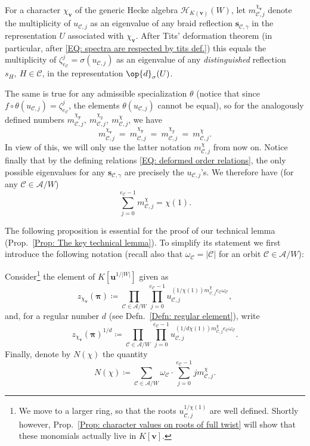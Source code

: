 For a character $\chi_{\bm v}$ of the generic Hecke algebra $\mathcal{H}_{K(\bm v)}(W)$, let $m^{\chi_{\bm v}}_{\mathcal{C},j}$ denote the multiplicity of $u_{\mathcal{C},j}$ as an eigenvalue of any braid reflection $\bm s_{\mathcal{C},\gamma}$ in the representation $U$ associated with $\chi_{\bm v}$. After Tits' deformation theorem (in particular, after \eqref{EQ: spectra are respected by tits def.}) this equals the multiplicity of $\zeta_{e_{\mathcal{C}}}^j=\sigma (u_{\mathcal{C},j})$ as an eigenvalue of any {\it distinguished} reflection $s_H,\ H\in\mathcal{C}$, in the representation $\op{d}_{\sigma}(U)$. 

The same is true for any admissible specialization $\theta$ (notice that since $f\circ\theta (u_{\mathcal{C},j})=\zeta_{e_{\mathcal{C}}}^j$, the elements $\theta(u_{\mathcal{C},j})$ cannot be equal), so for the analogously defined numbers $m^{\chi_{\bm y}}_{\mathcal{C},j},\ m^{\chi_y}_{\mathcal{C},j},\ m^{\chi}_{\mathcal{C},j}$, we have $$  m^{\chi_{\bm v}}_{\mathcal{C},j}\ =\ m^{\chi_{\bm y}}_{\mathcal{C},j}\ =\ m^{\chi_y}_{\mathcal{C},j}\ =\ m^{\chi}_{\mathcal{C},j}.$$ In view of this, we will only use the latter notation $m^{\chi}_{\mathcal{C},j}$ from now on. Notice finally that by the defining relations \eqref{EQ: deformed order relations}, the only possible eigenvalues for any $\bm s_{\mathcal{C},\gamma}$ are precisely the $u_{\mathcal{C},j}$'s. We therefore have (for any $\mathcal{C}\in\mathcal{A}/W$) \begin{equation} \sum_{j=0}^{e_{\mathcal{C}}-1}m^{\chi}_{\mathcal{C},j}=\chi(1).\label{Eq: sum of m_H,j's=chi(1)}\end{equation} 


The following proposition is essential for the proof of our technical lemma (Prop.~\ref{Prop: The key technical lemma}). To simplify its statement we first introduce the following notation (recall also that $\omega_{\mathcal{C}}=|\mathcal{C}|$ for an orbit $\mathcal{C}\in\mathcal{A}/W$):

\begin{defi}\label{Def. Pre character value stuff}
Consider\footnote{We move to a larger ring, so that the roots $u_{\mathcal{C},j}^{1/\chi(1)}$ are well defined. Shortly however, Prop.~\ref{Prop: character values on roots of full twist} will show that these monomials actually live in $K[\bm v]$.} the element of $K[\bm u^{1/|W|}]$ given as $$z_{\chi_{\bm v}}(\bm \pi)\coloneqq \prod_{\mathcal{C}\in\mathcal{A}/W}\prod_{j=0}^{e_{\mathcal{C}}-1}u_{\mathcal{C},j}^{(1/\chi(1))m^{\chi}_{\mathcal{C},j}e_{\mathcal{C}}\omega_{\mathcal{C}}},$$ and, for a regular number $d$ \textup{(}see Defn.~\ref{Defn: regular element}\textup{)}, write $$z_{\chi_{\bm v}}(\bm \pi)^{1/d}\coloneqq \prod_{\mathcal{C}\in\mathcal{A}/W}\prod_{j=0}^{e_{\mathcal{C}}-1}u_{\mathcal{C},j}^{(1/d\chi(1))m^{\chi}_{\mathcal{C},j}e_{\mathcal{C}}\omega_{\mathcal{C}}}.$$
Finally, denote by $N(\chi)$ the quantity $$N(\chi)\coloneqq \sum_{\mathcal{C}\in\mathcal{A}/W}\omega_{\mathcal{C}}\cdot\sum_{j=0}^{e_{\mathcal{C}}-1}jm^{\chi}_{\mathcal{C},j}.$$
\end{defi}

